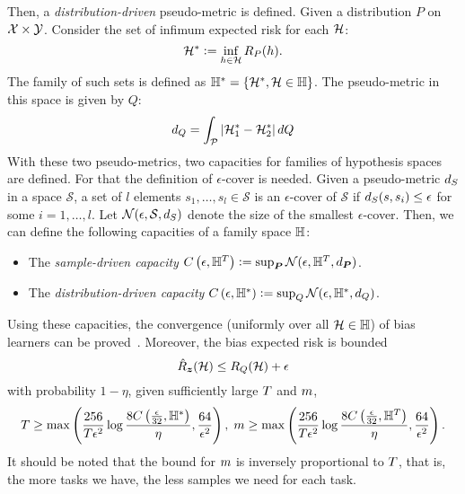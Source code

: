 Then, a \emph{distribution-driven} pseudo-metric is defined. Given a distribution $P$ on $\mathcal{X} \times \mathcal{Y}$. Consider the set of infimum expected risk for each $\mathcal{H}$:
\begin{equation}
    \nonumber
    \mathcal{H}^* \vcentcolon= \inf_{h \in \mathcal{H}} R_P(h).
\end{equation}
The family of such sets is defined as 
$\mathbb{H}^{*} = \left\{\mathcal{H}^*, \mathcal{H} \in \mathbb{H}\right\}$.
The pseudo-metric in this space is given by $Q$:
\begin{equation}
    \nonumber
    d_{Q} = \int_{\mathcal{P}} \left|\mathcal{H}_1^* - \mathcal{H}_2^*\right| dQ
\end{equation}
With these two pseudo-metrics, two capacities for families of hypothesis spaces are defined. For that the definition of $\epsilon$-cover is needed. Given a pseudo-metric $d_{S}$ in a space $\mathcal{S}$, 
a set of $l$ elements $s_1, \ldots, s_l \in \mathcal{S}$ is an $\epsilon$-cover of $\mathcal{S}$ if 
$ d_{S}(s, s_i) \leq \epsilon $
for some $i=1, \ldots, l$.  Let $\mathcal{N}(\epsilon, \mathcal{S}, d_{S})$ denote the size of the smallest $\epsilon$-cover.
Then, we can define the following capacities of a family space $\mathbb{H}$:
\begin{itemize}
    \item The \emph{sample-driven capacity} $C\left(\epsilon, \mathbb{H}^{T}\right) \vcentcolon= \sup_{\bm{P}} \mathcal{N}(\epsilon, \mathbb{H}^T, d_{\bm{P}})$.
    \item The \emph{distribution-driven capacity} $C\left(\epsilon, \mathbb{H}^{*}\right) \vcentcolon= \sup_Q \mathcal{N}(\epsilon, \mathbb{H}^{*}, d_{Q})$.
\end{itemize}

Using these capacities, the convergence (uniformly over all $\mathcal{H} \in \mathbb{H}$) of bias learners can be proved~\cite[Theorem~2]{baxter2000model}. Moreover, the bias expected risk is bounded
\begin{equation}
    \nonumber
    \hat{R}_{\bm{z}}(\mathcal{H}) \leq R_Q(\mathcal{H}) + \epsilon
\end{equation}
with probability $1 - \eta$, given sufficiently large $T$ and $m$, 
\begin{equation}
    \nonumber
    T \geq \max \left( \frac{256}{T \epsilon^2} \log\frac{8C\left(\frac{\epsilon}{32}, \mathbb{H}^{*}\right)}{\eta} , \frac{64}{\epsilon^2}\right)  , \; m \geq \max \left( \frac{256}{T \epsilon^2} \log\frac{8C\left(\frac{\epsilon}{32}, \mathbb{H}^{T}\right)}{\eta} , \frac{64}{\epsilon^2}\right) .
\end{equation}
It should be noted that the bound for $m$ is inversely proportional to $T$, that is, the more tasks we have, the less samples we need for each task. 



